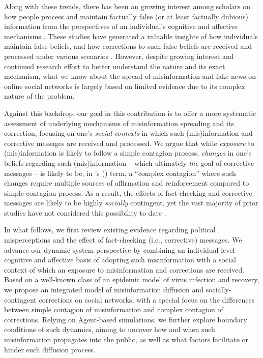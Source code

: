 \documentclass[man, 12pt, a4paper]{apa6}
\begin{document}
	Along with these trends, there has been an growing interest among scholars on how people process and maintain factually false (or at least factually dubious) information from the perspectives of an individual's cognitive and affective mechanisms \parencite{LEWANDOWSKY_JARMC2017, Lewandowsky_2012PSPI, kuklinski2000misinformation, garrett2016driving, weeks2015emotions}. These studies have generated a valuable insights of how individuals maintain false beliefs, and how corrections to such false beliefs are received and processed under various scenarios \parencite{LEWANDOWSKY_JARMC2017, thorson_2016}. However, despite growing interest and continued research effort to better understand the nature and its exact mechanism, what we know about the spread of misinformation and fake news on online social networks is largely based on limited evidence due to its complex nature of the problem.

	Against this backdrop, our goal in this contribution is to offer a more systematic assessment of underlying mechanisms of misinformation spreading and its correction, focusing on one's \emph{social contexts} in which such (mis)information and corrective messages are received and processed. We argue that while \emph{exposure} to (mis)information is likely to follow a simple contagion process, \emph{changes} in one's beliefs regarding such (mis)information -- which ultimately \emph{the} goal of corrective messages -- is likely to be, in \citeauthor{centola2007complex}'s (\citeyear{centola2007complex}) term, a \enquote{complex contagion} where such changes require multiple sources of affirmation and reinforcement compared to simple contagion process. As a result, the effects of fact-checking and corrective messages are likely to be highly \emph{socially} contingent, yet the vast majority of prior studies have not considered this possibility to date \parencite{margolin2017}.    

	In what follows, we first review existing evidence regarding political misperceptions and the effect of fact-checking (i.e., corrective) messages. We advance our dynamic system perspective by combining an individual-level cognitive and affective basis of adopting such misinformation with a social context of which an exposure to misinformation and corrections are received. Based on a well-known class of an epidemic model of virus infection and recovery, we propose an integrated model of misinformation diffusion and socially-contingent corrections on social networks, with a special focus on the differences between simple contagion of misinformation and complex contagion of corrections. Relying on Agent-based simulations, we further explore boundary conditions of such dynamics, aiming to uncover how and when such misinformation propagates into the public, as well as what factors facilitate or hinder such diffusion process.
\end{document}

